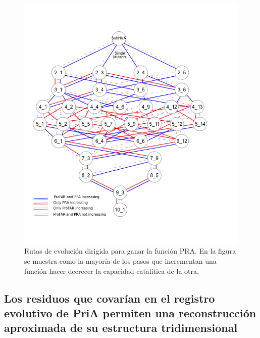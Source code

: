 \documentclass[12pt,twoside]{reedthesis}
\begin{document}
  \begin{figure}[h!tbp]
  \centering
  \includegraphics[angle = 0,scale = 0.8]{chapter4/LianetFiguras/SolocirculosPRA_PRO_RUTAS_10_1_r002.png}
  \caption[Positive increments on PRA]{\footnotesize{Rutas de evolución dirigida para ganar la función PRA. En la figura se muestra como la mayoría de los pasos que incrementan una función hacer decrecer la capacidad catalítica de la otra. }}
  \label{fig:PRARutas}
  \end{figure}
  
  \subsection{Los residuos que covarían en el registro evolutivo de PriA
  permiten una reconstrucción aproximada de su estructura
  tridimensional}\label{los-residuos-que-covarian-en-el-registro-evolutivo-de-pria-permiten-una-reconstruccion-aproximada-de-su-estructura-tridimensional}
  
\end{document}
